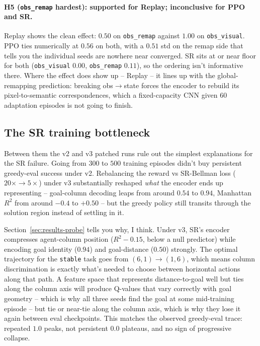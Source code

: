 \documentclass{article}
\begin{document}
\paragraph{H5 (\texttt{obs\_remap} hardest): supported for Replay; inconclusive for PPO and SR.} Replay shows the clean effect: $0.50$ on \texttt{obs\_remap} against $1.00$ on \texttt{obs\_visual}. PPO ties numerically at $0.56$ on both, with a $0.51$ std on the remap side that tells you the individual seeds are nowhere near converged. SR sits at or near floor for both (\texttt{obs\_visual} $0.00$, \texttt{obs\_remap} $0.11$), so the ordering isn't informative there. Where the effect does show up -- Replay -- it lines up with the global-remapping prediction: breaking obs$\rightarrow$state forces the encoder to rebuild its pixel-to-semantic correspondences, which a fixed-capacity CNN given 60 adaptation episodes is not going to finish.

\subsection{The SR training bottleneck}
\label{sec:discussion-bottleneck}

Between them the v2 and v3 patched runs rule out the simplest explanations for the SR failure. Going from $300$ to $500$ training episodes didn't buy persistent greedy-eval success under v2. Rebalancing the reward vs SR-Bellman loss ($20\times\rightarrow 5\times$) under v3 substantially reshaped \emph{what} the encoder ends up representing -- goal-column decoding leaps from around $0.54$ to $0.94$, Manhattan $R^2$ from around $-0.4$ to $+0.50$ -- but the greedy policy still transits through the solution region instead of settling in it.

Section~\ref{sec:results-probe} tells you why, I think. Under v3, SR's encoder compresses agent-column position ($R^2{-}0.15$, below a null predictor) while encoding goal identity ($0.94$) and goal-distance ($0.50$) strongly. The optimal trajectory for the \texttt{stable} task goes from $(6,1)\rightarrow(1,6)$, which means column discrimination is exactly what's needed to choose between horizontal actions along that path. A feature space that represents distance-to-goal well but ties along the column axis will produce Q-values that vary correctly with goal geometry -- which is why all three seeds find the goal at some mid-training episode -- but tie or near-tie along the column axis, which is why they lose it again between eval checkpoints. This matches the observed greedy-eval trace: repeated $1.0$ peaks, not persistent $0.0$ plateaus, and no sign of progressive collapse.
\end{document}
